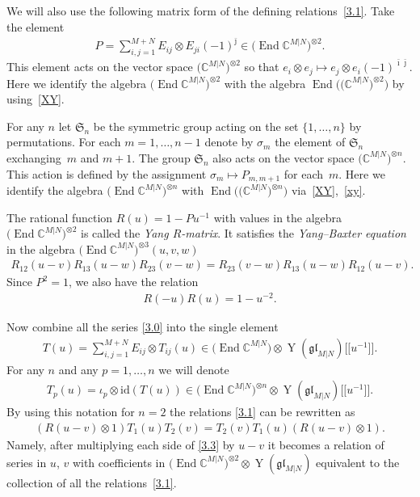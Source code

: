 \documentclass[11pt]{article}
\numberwithin{equation}{section}
\def\1{^{-1}}
\def\bi{{\bar\imath }}
\def\bj{{\bar\jmath }}
\def\CC{{\mathbb{C}}}
\def\CMN{\CC^{M|N}}
\def\End{\operatorname{End}}
\def\glMN{\mathfrak{gl}_{M|N}}
\def\id{{\mathrm{id}}}
\def\ot{\otimes}
\def\si{\sigma}
\def\Sym{\mathfrak{S}}
\def\YMN{\operatorname{Y}(\glMN)}
\begin{document}
We will also use the following matrix form of the defining relations~\eqref{3.1}.
Take the element
\begin{gather}\label{pop}
P = \sum_{i,j=1}^{M+N} E_{ij}\ot E_{ji} (-1)^{\bj}
\in\big(\End\CMN\big)^{\ot 2} .
\end{gather}
This element acts on the vector space $\big(\CMN\big)^{\ot 2}$ so that
$e_i\ot e_{j}\mapsto e_j\ot e_i {(-1)}^{\bi \bj}$.
Here we identify the algebra $\big(\End\CMN\big)^{\ot 2}$ with the algebra
$\End\big(\big(\CMN\big)^{\ot 2}\big)$ by using~\eqref{XY}.

For any $n$ let $\Sym_n$ be the symmetric group acting
on the set $\{1,\dots, n\}$ by permutations. For each $m=1,\dots, n-1$
denote by $\si_m$ the element of $\Sym_n$ exchanging~$m$ and $m+1 $.
The group $\Sym_n$ also acts on the vector space $\big(\CMN\big)^{\ot n}$.
This action is defined by the assignment
$\si_m\mapsto P_{m,m+1}$ for each~$m $.
Here we identify the algebra
$\big(\End\CMN\big)^{\ot n}$ with $\End\big(\big(\CMN\big)^{\ot n}\big)$ via~\eqref{XY},~\eqref{xy}.

The rational function $R(u)=1-P u\1$ with values in the algebra
$\big(\End\CMN\big)^{\ot 2}$ is called the {\it Yang $R$-matrix}.
It satisfies the {\it Yang--Baxter equation}
in the algebra $\big(\End\CMN\big)^{\ot 3}(u,v,w)$
\begin{gather}\label{3.6}
R_{12}(u-v) R_{13}(u-w) R_{23}(v-w)=R_{23}(v-w) R_{13}(u-w) R_{12}(u-v) .
\end{gather}
Since $P^2=1 $, we also have the relation
\begin{gather}\label{3.52}
R(-u) R(u)=1-u^{-2} .
\end{gather}

Now combine all the series \eqref{3.0} into the single element
\begin{gather}\label{tu}
T(u)=\sum_{i,j=1}^{M+N} E_{ij}\ot T_{ij}(u)
\in\big(\End\CMN\big)\ot\YMN \big[\big[u^{-1}\big]\big] .
\end{gather}
For any $n$ and any $p=1,\dots, n$ we will denote
\begin{gather}
T_p(u)=\iota_p\ot\id ( T(u)) \in\big(\End\CMN\big)^{\ot n}\ot\YMN \big[\big[u\1\big]\big] .\label{3.22}
\end{gather}
By using this notation for $n=2$
the relations \eqref{3.1} can be rewritten as
\begin{gather}\label{3.3}
(R (u-v)\ot1) T_1(u) T_2(v)=T_2(v) T_1(u) (R (u-v)\ot1) .
\end{gather}
Namely, after multiplying each side of \eqref{3.3} by $u-v$ it becomes
a relation of series in $u$, $v$ with coefficients in %
$\big(\End\CMN\big)^{\ot 2}\ot\YMN$
equivalent to the collection of all the relations~\eqref{3.1}.
\end{document}

